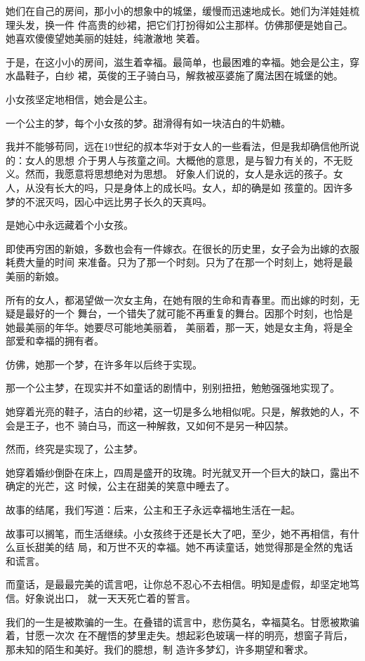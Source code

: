 		她们在自己的房间，那小小的想象中的城堡，缓慢而迅速地成长。她们为洋娃娃梳理头发，换一件
	件高贵的纱裙，把它们打扮得如公主那样。仿佛那便是她自己。她喜欢傻傻望她美丽的娃娃，纯澈澈地
	笑着。

		于是，在这小小的房间，滋生着幸福。最简单，也最困难的幸福。她会是公主，穿水晶鞋子，白纱
	裙，英俊的王子骑白马，解救被巫婆施了魔法困在城堡的她。

		小女孩坚定地相信，她会是公主。

		一个公主的梦，每个小女孩的梦。甜滑得有如一块洁白的牛奶糖。

		我并不能够苟同，远在19世纪的叔本华对于女人的一些看法，但是我却确信他所说的：女人的思想
	介于男人与孩童之间。大概他的意思，是与智力有关的，不无贬义。然而，我愿意将思想绝对为思想。
	好象人们说的，女人是永远的孩子。女人，从没有长大的吗，只是身体上的成长吗。女人，却的确是如
	孩童的。因许多梦的不泯灭吗，因心中远比男子长久的天真吗。

		是她心中永远藏着个小女孩。

		即使再穷困的新娘，多数也会有一件嫁衣。在很长的历史里，女子会为出嫁的衣服耗费大量的时间
	来准备。只为了那一个时刻。只为了在那一个时刻上，她将是最美丽的新娘。

		所有的女人，都渴望做一次女主角，在她有限的生命和青春里。而出嫁的时刻，无疑是最好的一个
	舞台，一个错失了就可能不再重复的舞台。因那个时刻，也恰是她最美丽的年华。她要尽可能地美丽着，
	美丽着，那一天，她是女主角，将是全部爱和幸福的拥有者。

		仿佛，她那一个梦，在许多年以后终于实现。

		那一个公主梦，在现实并不如童话的剧情中，别别扭扭，勉勉强强地实现了。

		她穿着光亮的鞋子，洁白的纱裙，这一切是多么地相似呢。只是，解救她的人，不会是王子，也不
	骑白马，而这一种解救，又如何不是另一种囚禁。

		然而，终究是实现了，公主梦。

		她穿着婚纱倒卧在床上，四周是盛开的玫瑰。时光就叉开一个巨大的缺口，露出不确定的光芒，这
	时候，公主在甜美的笑意中睡去了。

		故事的结尾，我们写道：后来，公主和王子永远幸福地生活在一起。

		故事可以搁笔，而生活继续。小女孩终于还是长大了吧，至少，她不再相信，有什么亘长甜美的结
	局，和万世不灭的幸福。她不再读童话，她觉得那是全然的鬼话和谎言。

		而童话，是最最完美的谎言吧，让你总不忍心不去相信。明知是虚假，却坚定地笃信。好象说出口，
	就一天天死亡着的誓言。

		我们的一生是被欺骗的一生。在叠错的谎言中，悲伤莫名，幸福莫名。甘愿被欺骗着，甘愿一次次
	在不醒悟的梦里走失。想起彩色玻璃一样的明亮，想窗子背后，那未知的陌生和美好。我们的臆想，制
	造许多梦幻，许多期望和奢求。

